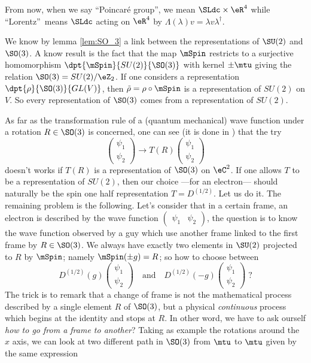 From now, when we say ``Poincaré group'', we mean $\SLdc\times\eR^4$ while  ``Lorentz''\ means $\SLdc$ acting on $\eR^4$ by $\Lambda(\lambda)v=\lambda v\lambda^{\dag}$.

We know by lemma \ref{lem:SO_3} a link between the representations of \( \SU(2)\) and \( \SO(3)\). A know result is the fact that the map $\mSpin$ restricts to a surjective homomorphism $\dpt{\mSpin}{SU(2)}{\SO(3)}$ with kernel $\pm\mtu$ giving the relation $\SO(3)=SU(2)/\eZ_2$. If one considers a representation $\dpt{\rho}{\SO(3)}{GL(V)}$, then $\tilde\rho=\rho\circ\mSpin$ is a representation of $SU(2)$ on $V$. So every representation of $\SO(3)$ comes from a representation of $SU(2)$.

As far as the transformation rule of a (quantum mechanical) wave function under a rotation $R\in \SO(3)$ is concerned, one can see (it is done in \cite{Naber}) that the try
\[
	\begin{pmatrix}
		\psi_1 \\
		\psi_2
	\end{pmatrix}\to
	T(R)
	\begin{pmatrix}
		\psi_1 \\
		\psi_2
	\end{pmatrix}
\]
doesn't works if $T(R)$ is a representation of $\SO(3)$ on $\eC^2$. If one allows $T$ to be a representation of $SU(2)$, then our choice ---for an electron--- should naturally be the spin one half representation $T=D^{(1/2)}$. Let us do it. The remaining problem is the following. Let's consider that in a certain frame, an electron is described by the wave function $\begin{pmatrix} \psi_1&\psi_2\end{pmatrix}$, the question is to know the wave function observed by a guy which use another frame linked to the first frame by $R\in \SO(3)$. We always have exactly two elements in $\SU(2)$ projected to $R$ by $\mSpin$; namely $\mSpin(\pm g)=R$; so how to choose between
\[
	D^{(1/2)}(g)
	\begin{pmatrix}
		\psi_1 \\
		\psi_2
	\end{pmatrix}
	\quad\text{and}\quad
	D^{(1/2)}(-g)
	\begin{pmatrix}
		\psi_1 \\
		\psi_2
	\end{pmatrix}\; ?
\]
The trick is to remark that a change of frame is not the mathematical process described by a single element $R$ of $\SO(3)$, but a physical \emph{continuous} process which begins at the identity and stops at $R$. In other word, we have to ask ourself \emph{how to go from a frame to another}? Taking as example the rotations around the $x$ axis, we can look at two different path in $\SO(3)$ from $\mtu$ to $\mtu$ given by the same expression
